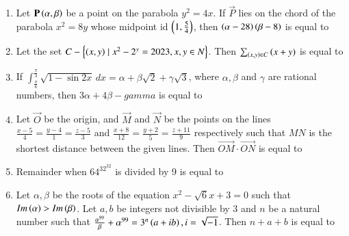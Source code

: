 \documentclass[journal]{IEEEtran}
\begin{document}
\begin{enumerate}
\item Let $\mathbf{P}\left(\alpha,\beta\right)$ be a point on the parabola $y^2=4x$. If $\vec{P}$ lies on the chord of the parabola $x^2=8y$ whose midpoint id $\left(1,\frac{5}{4}\right)$, then $\left(\alpha-28\right)\left(\beta-8\right)$ is equal to 

\item Let the set $C-\left\{\left(x,y\right)\mid x^2-2^y=2023,x,y\in N\right\}$. Then $\sum_{\left(x,y\right)\in C}\left(x+y\right)$ is equal to

\item If $\int_{\frac{\pi}{6}}^{\frac{\pi}{3}} \sqrt{1-\sin 2x} \, dx=\alpha+\beta\sqrt{2}+\gamma\sqrt{3}$, where $\alpha,\beta$ and $\gamma$ are rational numbers, then $3\alpha+4\beta-gamma$ is equal to

\item Let $\vec{O}$ be the origin, and $\vec{M}$ and $\vec{N}$ be the points on the lines $\frac{x-5}{4}=\frac{y-4}{1}=\frac{z-5}{3}$ and $\frac{x+8}{12}=\frac{y+2}{5}=\frac{z+11}{9}$ respectively such that $MN$ is the shortest distance between the given lines. Then $\overrightarrow{OM}\cdot\overrightarrow{ON}$ is equal to

\item Remainder when $64^{{32}^{32}}$ is divided by 9 is equal to

\item Let $\alpha,\beta$ be the roots of the equation $x^2-\sqrt{6}x+3=0$ such that $Im\left(\alpha\right)>Im\left(\beta\right)$. Let $a,b$ be integers not divisible by 3 and $n$ be a natural number such that $\frac{\alpha^{99}}{\beta}+\alpha^{99}=3^n\left(a+ib\right),i=\sqrt{-1}$. Then $n+a+b$ is equal to
\end{enumerate}
\end{document}
